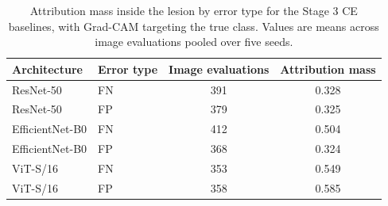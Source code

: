 \begin{table}[h]
\centering
\small
\caption{Attribution mass inside the lesion by error type for the Stage 3 CE baselines, with Grad-CAM targeting the true class. Values are means across image evaluations pooled over five seeds.}
\label{tab:suppxai}
\begin{tabular}{llcc}
\toprule
Architecture & Error type & Image evaluations & Attribution mass \\
\midrule
ResNet-50 & FN & 391 & 0.328 \\
ResNet-50 & FP & 379 & 0.325 \\
EfficientNet-B0 & FN & 412 & 0.504 \\
EfficientNet-B0 & FP & 368 & 0.324 \\
ViT-S/16 & FN & 353 & 0.549 \\
ViT-S/16 & FP & 358 & 0.585 \\
\bottomrule
\end{tabular}
\end{table}
